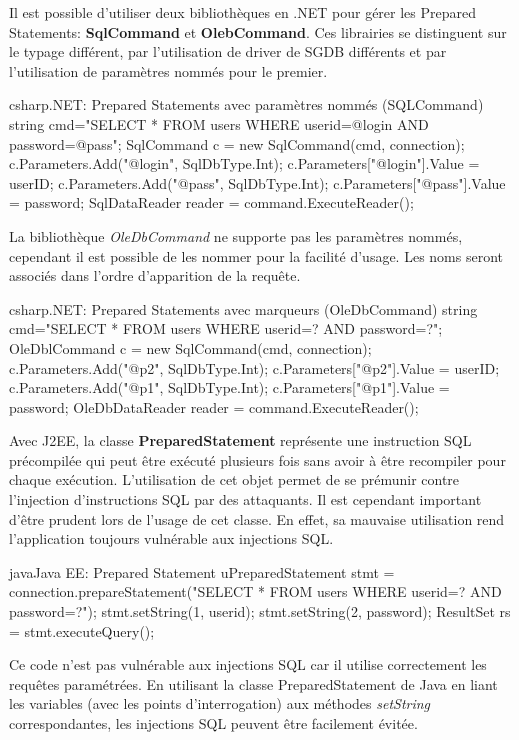 Il est possible d'utiliser deux bibliothèques en .NET pour gérer les Prepared Statements: \textbf{SqlCommand} et \textbf{OlebCommand}. Ces librairies se distinguent sur le typage différent, par l'utilisation de driver de SGDB différents et par l'utilisation de paramètres nommés pour le premier.
\begin{Config}{csharp}{.NET: Prepared Statements avec paramètres nommés (SQLCommand)}
string cmd="SELECT * FROM users WHERE userid=@login AND password=@pass";
SqlCommand c = new SqlCommand(cmd, connection);
c.Parameters.Add("@login", SqlDbType.Int);
c.Parameters["@login"].Value = userID;
c.Parameters.Add("@pass", SqlDbType.Int);
c.Parameters["@pass"].Value = password;
SqlDataReader reader = command.ExecuteReader();
\end{Config}	
La bibliothèque \textit{OleDbCommand} ne supporte pas les paramètres nommés, cependant il est possible de les nommer pour la facilité d'usage. Les noms seront associés dans l'ordre d'apparition de la requête.
\begin{Config}{csharp}{.NET: Prepared Statements avec marqueurs (OleDbCommand)}
string cmd="SELECT * FROM users WHERE userid=? AND password=?";
OleDblCommand c = new SqlCommand(cmd, connection);
c.Parameters.Add("@p2", SqlDbType.Int);
c.Parameters["@p2"].Value = userID;
c.Parameters.Add("@p1", SqlDbType.Int);
c.Parameters["@p1"].Value = password;
OleDbDataReader reader = command.ExecuteReader();
\end{Config}	\newline\newline
Avec \gls{J2EE}, la classe \textbf{PreparedStatement} représente une instruction SQL précompilée qui peut être exécuté plusieurs fois sans avoir à être recompiler pour chaque exécution.
L’utilisation de cet objet permet de se prémunir contre l’injection d’instructions SQL par des attaquants.
Il est cependant important d’être prudent lors de l’usage de cet classe. En effet, sa mauvaise utilisation rend l’application toujours vulnérable aux injections SQL.\\

\begin{Config}{java}{Java EE: Prepared Statement}
uPreparedStatement stmt = 
	connection.prepareStatement("SELECT * FROM users WHERE userid=? AND password=?");
stmt.setString(1, userid);
stmt.setString(2, password);
ResultSet rs = stmt.executeQuery();
\end{Config}	

 Ce code n’est pas vulnérable aux injections SQL car il utilise correctement les requêtes paramétrées. En utilisant la classe PreparedStatement de Java en liant les variables (avec les points d'interrogation) aux méthodes \textit{setString} correspondantes, les  injections SQL peuvent être facilement évitée.

